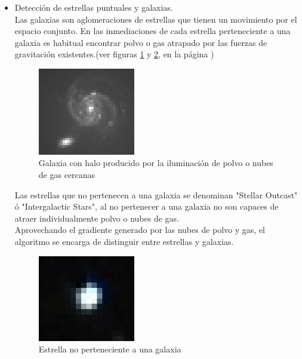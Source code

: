 \begin{itemize}
		
		\item Detección de estrellas puntuales y galaxias.\\
		Las galaxias son aglomeraciones de estrellas que tienen un movimiento
		por el espacio conjunto. En las inmediaciones de cada estrella perteneciente
		a una galaxia es habitual encontrar polvo o gas atrapado por las fuerzas
		de gravitación existentes.(ver figuras \ref{fig:GalaxiHalo} y \ref{fig:IntergalacticStar}, en la página \pageref{fig:GalaxiHalo})\\
		\begin{figure}[!htb]
			\centering
			\includegraphics[width=0.4\textwidth]{images/twoGalaxyHalo.jpg}
			\caption{\label{fig:GalaxiHalo}Galaxia con halo producido por la iluminación de polvo o nubes de gas cercanas}
		\end{figure}
		Las estrellas que no pertenecen a una galaxia se denominan "Stellar
		Outcast" ó "Intergalactic Stars", al no pertenecer a una galaxia
		no son capaces de atraer individualmente polvo o nubes de gas.\\
		Aprovechando el gradiente generado por las nubes de polvo y gas, el
		algoritmo se encarga de distinguir entre estrellas y galaxias.
		\begin{figure}[!htb]
			\centering
			\includegraphics[width=0.4\textwidth]{images/star.jpg}
			\caption{\label{fig:IntergalacticStar}Estrella no perteneciente a una galaxia}
		\end{figure}


\end{itemize}
